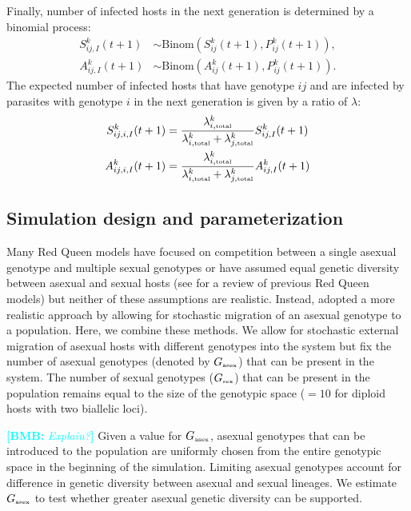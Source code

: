 \documentclass{article}\usepackage[]{graphicx}\usepackage[]{color}
\newcommand{\comment}[3]{\textcolor{#1}{\textbf{[#2: }\textit{#3}\textbf{]}}}
\newcommand{\bmb}[1]{\comment{cyan}{BMB}{#1}}
\begin{document}
Finally, number of infected hosts in the next generation is determined by a binomial process:
\begin{equation}
\begin{aligned}
S_{ij,I}^k (t+1) &\sim \mathrm{Binom}(S_{ij}^k (t+1), P_{ij}^k(t+1)),\\
A_{ij,I}^k (t+1) &\sim \mathrm{Binom}(A_{ij}^k (t+1), P_{ij}^k(t+1)).
\end{aligned}
\end{equation}
The expected number of infected hosts that have genotype $ij$ and are infected by parasites with genotype $i$ in the next generation is given by a ratio of $\lambda$:
\begin{equation}
\begin{aligned}
S_{ij,i,I}^k(t+1) &= \frac{\lambda_{i, \textrm{\tiny total}}^k}{\lambda_{i, \textrm{\tiny total}}^k + \lambda_{j, \textrm{\tiny total}}^k} S_{ij,I}^k(t+1)\\
A_{ij,i,I}^k(t+1) &= \frac{\lambda_{i, \textrm{\tiny total}}^k}{\lambda_{i, \textrm{\tiny total}}^k + \lambda_{j, \textrm{\tiny total}}^k} A_{ij,I}^k(t+1)
\end{aligned}
\end{equation}

\subsection{Simulation design and parameterization}

Many Red Queen models have focused on competition between a single asexual genotype and multiple sexual genotypes or have assumed equal genetic diversity between asexual and sexual hosts (see \citep{ashby2015diversity} for a review of previous Red Queen models) but neither of these assumptions are realistic.
Instead, \cite{ashby2015diversity} adopted a more realistic approach by allowing for stochastic migration of an asexual genotype to a population.
Here, we combine these methods.
We allow for stochastic external migration of asexual hosts with different genotypes into the system but fix the number of asexual genotypes (denoted by $G_{\textrm{\tiny asex}}$) that can be present in the system. 
The number of sexual genotypes ($G_{\textrm{\tiny sex}}$) that can be present in the population remains equal to the size of the genotypic space ($=10$ for diploid hosts with two biallelic loci).

\bmb{Explain?}
Given a value for $G_{\textrm{\tiny asex}}$, asexual genotypes that can be introduced to the population are uniformly chosen from the entire genotypic space in the beginning of the simulation.
Limiting asexual genotypes account for difference in genetic diversity between asexual and sexual lineages.
We estimate $G_{\textrm{\tiny asex}}$ to test whether greater asexual genetic diversity can be supported.
\end{document}
